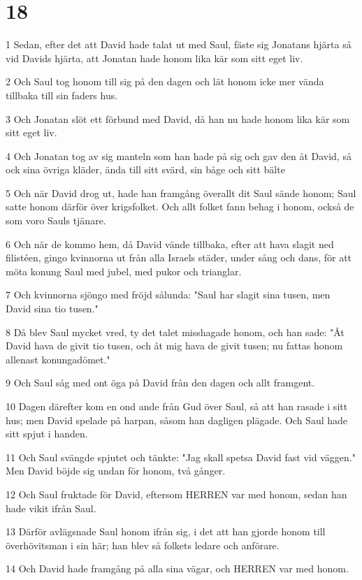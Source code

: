 \chapter{18}

\par 1 Sedan, efter det att David hade talat ut med Saul, fäste sig Jonatans hjärta så vid Davids hjärta, att Jonatan hade honom lika kär som sitt eget liv.
\par 2 Och Saul tog honom till sig på den dagen och lät honom icke mer vända tillbaka till sin faders hus.
\par 3 Och Jonatan slöt ett förbund med David, då han nu hade honom lika kär som sitt eget liv.
\par 4 Och Jonatan tog av sig manteln som han hade på sig och gav den åt David, så ock sina övriga kläder, ända till sitt svärd, sin båge och sitt bälte
\par 5 Och när David drog ut, hade han framgång överallt dit Saul sände honom; Saul satte honom därför över krigsfolket. Och allt folket fann behag i honom, också de som voro Sauls tjänare.
\par 6 Och när de kommo hem, då David vände tillbaka, efter att hava slagit ned filistéen, gingo kvinnorna ut från alla Israels städer, under sång och dans, för att möta konung Saul med jubel, med pukor och trianglar.
\par 7 Och kvinnorna sjöngo med fröjd sålunda: "Saul har slagit sina tusen, men David sina tio tusen."
\par 8 Då blev Saul mycket vred, ty det talet misshagade honom, och han sade: "Åt David hava de givit tio tusen, och åt mig hava de givit tusen; nu fattas honom allenast konungadömet."
\par 9 Och Saul såg med ont öga på David från den dagen och allt framgent.
\par 10 Dagen därefter kom en ond ande från Gud över Saul, så att han rasade i sitt hus; men David spelade på harpan, såsom han dagligen plägade. Och Saul hade sitt spjut i handen.
\par 11 Och Saul svängde spjutet och tänkte: "Jag skall spetsa David fast vid väggen." Men David böjde sig undan för honom, två gånger.
\par 12 Och Saul fruktade för David, eftersom HERREN var med honom, sedan han hade vikit ifrån Saul.
\par 13 Därför avlägsnade Saul honom ifrån sig, i det att han gjorde honom till överhövitsman i sin här; han blev så folkets ledare och anförare.
\par 14 Och David hade framgång på alla sina vägar, och HERREN var med honom.
